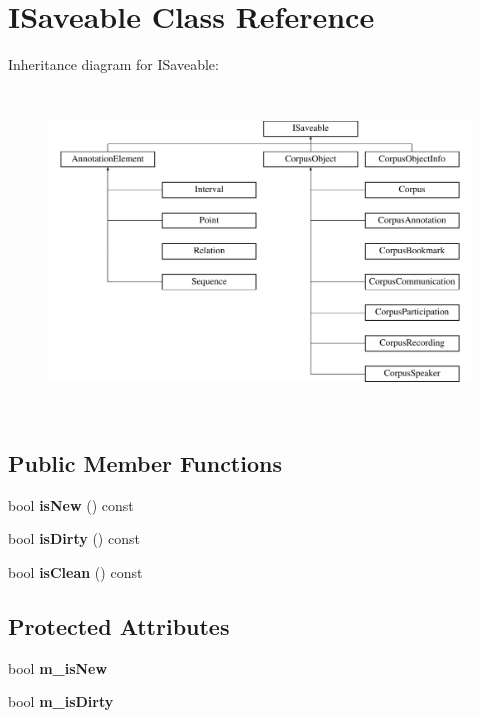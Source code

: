 \hypertarget{class_i_saveable}{}\section{I\+Saveable Class Reference}
\label{class_i_saveable}
Inheritance diagram for I\+Saveable\+:\begin{figure}[H]
\begin{center}
\leavevmode
\includegraphics[height=8.630136cm]{class_i_saveable}
\end{center}
\end{figure}
\subsection*{Public Member Functions}
\begin{DoxyCompactItemize}
\item 
\mbox{\label{class_i_saveable_a4e9725932af3d42687776ef9689eaa25}} 
bool {\bfseries is\+New} () const
\item 
\mbox{\label{class_i_saveable_a70510ebb74fe06d1c50f73862f186fd6}} 
bool {\bfseries is\+Dirty} () const
\item 
\mbox{\label{class_i_saveable_ae8ee458c2bc3e977a971fa97f2dbe10d}} 
bool {\bfseries is\+Clean} () const
\end{DoxyCompactItemize}
\subsection*{Protected Attributes}
\begin{DoxyCompactItemize}
\item 
\mbox{\label{class_i_saveable_a07f21a8f451f763d001fca3230de622f}} 
bool {\bfseries m\+\_\+is\+New}
\item 
\mbox{\label{class_i_saveable_afc22c6c852aea93e4d8e3cd2fb051460}} 
bool {\bfseries m\+\_\+is\+Dirty}
\end{DoxyCompactItemize}
